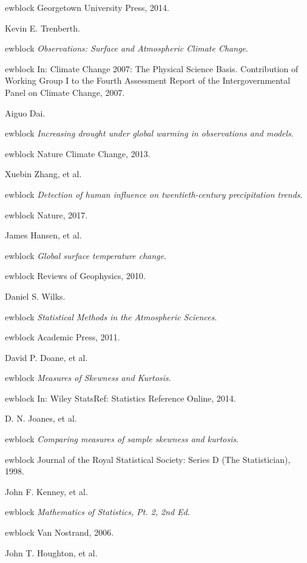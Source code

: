 \documentclass{article}
\begin{document}
\begin{thebibliography}{10}
ewblock Georgetown University Press, 2014.

Kevin E. Trenberth.

ewblock {\em Observations: Surface and Atmospheric Climate Change}.

ewblock In: Climate Change 2007: The Physical Science Basis. Contribution of Working Group I to the Fourth Assessment Report of the Intergovernmental Panel on Climate Change, 2007.

Aiguo Dai.

ewblock {\em Increasing drought under global warming in observations and models}.

ewblock Nature Climate Change, 2013.

Xuebin Zhang, et al.

ewblock {\em Detection of human influence on twentieth-century precipitation trends}.

ewblock Nature, 2017.

James Hansen, et al.

ewblock {\em Global surface temperature change}.

ewblock Reviews of Geophysics, 2010.

Daniel S. Wilks.

ewblock {\em Statistical Methods in the Atmospheric Sciences}.

ewblock Academic Press, 2011.

David P. Doane, et al.

ewblock {\em Measures of Skewness and Kurtosis}.

ewblock In: Wiley StatsRef: Statistics Reference Online, 2014.

D. N. Joanes, et al.

ewblock {\em Comparing measures of sample skewness and kurtosis}.

ewblock Journal of the Royal Statistical Society: Series D (The Statistician), 1998.

John F. Kenney, et al.

ewblock {\em Mathematics of Statistics, Pt. 2, 2nd Ed}.

ewblock Van Nostrand, 2006.

John T. Houghton, et al.


\end{thebibliography}
\end{document}

